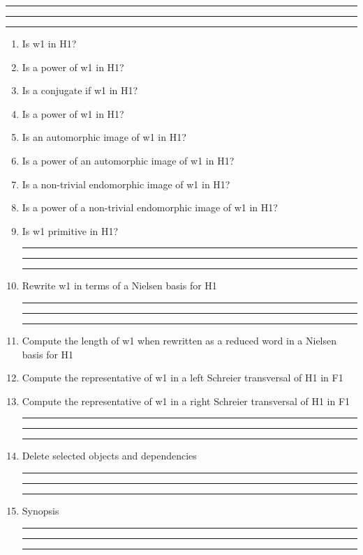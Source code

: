 
\bigskip
\hrule\hrule\hrule

\begin{enumerate}

\item Is w1 in H1?

\item Is a power of w1 in H1?

\item Is a conjugate if w1 in H1?

\item Is a power of w1 in H1?

\item Is an automorphic image of w1 in H1?

\item Is a power of an automorphic image of w1 in H1?

\item Is a non-trivial endomorphic image of w1 in H1?

\item Is a power of a non-trivial endomorphic image of w1 in H1?

\item Is w1 primitive in H1?

\bigskip
\hrule\hrule\hrule

\item Rewrite w1 in terms of a Nielsen basis for H1

\bigskip
\hrule\hrule\hrule

\item Compute the length of w1 when rewritten as a reduced word in a
Nielsen basis for H1

\item Compute the representative of w1 in a left Schreier
transversal of H1 in F1

\item Compute the representative of w1 in a right Schreier
transversal of H1 in F1

\bigskip
\hrule\hrule\hrule

\item Delete selected objects and dependencies

\bigskip
\hrule\hrule\hrule

\item
Synopsis

\bigskip
\hrule\hrule\hrule

\end{enumerate}

